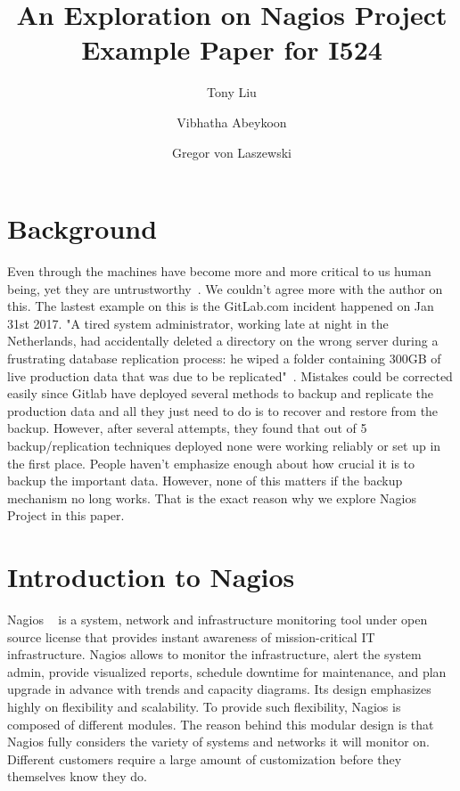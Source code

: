 \documentclass[9pt,twocolumn,twoside]{styles/osajnl}
\title{\centering%
An Exploration on Nagios Project \\
\large Example Paper for I524}
\author[1]{Tony Liu}
\author[1]{Vibhatha Abeykoon}
\author[1]{Gregor von Laszewski}
\affil[1]{School of Informatics and Computing, Bloomington, IN 47408, U.S.A.}
\begin{document}
\maketitle

\section{Background}

Even through the machines have become more and more critical to us human being, yet they are untrustworthy~\cite{nagios-book}. We couldn't agree more with the author on this. The lastest example on this is the GitLab.com incident happened on Jan 31st 2017. "A tired system administrator, working late at night in the Netherlands, had accidentally deleted a directory on the wrong server during a frustrating database replication process: he wiped a folder containing 300GB of live production data that was due to be replicated"~\cite{gitlabmeltdown}. Mistakes could be corrected easily since Gitlab have deployed several methods to backup and replicate the production data and all they just need to do is to recover and restore from the backup. However, after several attempts, they found that out of 5 backup/replication techniques deployed none were working reliably or set up in the first place. People haven't emphasize enough about how crucial it is to backup the important data. However, none of this matters if the backup mechanism no long works. That is the exact reason why we explore Nagios Project in this paper.


\section{Introduction to Nagios}

Nagios ~\cite{www-nagios, wiki-nagios} is a system, network and infrastructure monitoring tool under open source license that provides instant awareness of mission-critical IT infrastructure. Nagios allows to monitor the infrastructure, alert the system admin, provide visualized reports, schedule downtime for maintenance, and plan upgrade in advance with trends and capacity diagrams. Its design emphasizes highly on flexibility and scalability. To provide such flexibility, Nagios is composed of different modules. The reason behind this modular design is that Nagios fully considers the variety of systems and networks it will monitor on. Different customers require a large amount of customization before they themselves know they do.
\end{document}
